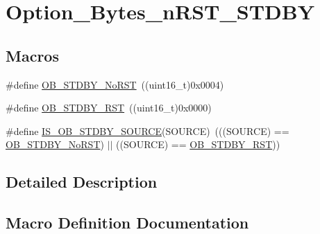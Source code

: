 \hypertarget{group___option___bytes__n_r_s_t___s_t_d_b_y}{}\section{Option\+\_\+\+Bytes\+\_\+n\+R\+S\+T\+\_\+\+S\+T\+D\+BY}
\label{group___option___bytes__n_r_s_t___s_t_d_b_y}
\subsection*{Macros}
\begin{DoxyCompactItemize}
\item 
\#define \mbox{\hyperlink{group___option___bytes__n_r_s_t___s_t_d_b_y_ga9588443b20719498422aeb72b65de839}{O\+B\+\_\+\+S\+T\+D\+B\+Y\+\_\+\+No\+R\+ST}}~((uint16\+\_\+t)0x0004)
\item 
\#define \mbox{\hyperlink{group___option___bytes__n_r_s_t___s_t_d_b_y_ga69451a6f69247528f58735c9c83499ce}{O\+B\+\_\+\+S\+T\+D\+B\+Y\+\_\+\+R\+ST}}~((uint16\+\_\+t)0x0000)
\item 
\#define \mbox{\hyperlink{group___option___bytes__n_r_s_t___s_t_d_b_y_ga8a05393df3a5e89551b4e2e1e8c5b884}{I\+S\+\_\+\+O\+B\+\_\+\+S\+T\+D\+B\+Y\+\_\+\+S\+O\+U\+R\+CE}}(S\+O\+U\+R\+CE)~(((S\+O\+U\+R\+CE) == \mbox{\hyperlink{group___option___bytes__n_r_s_t___s_t_d_b_y_ga9588443b20719498422aeb72b65de839}{O\+B\+\_\+\+S\+T\+D\+B\+Y\+\_\+\+No\+R\+ST}}) $\vert$$\vert$ ((S\+O\+U\+R\+CE) == \mbox{\hyperlink{group___option___bytes__n_r_s_t___s_t_d_b_y_ga69451a6f69247528f58735c9c83499ce}{O\+B\+\_\+\+S\+T\+D\+B\+Y\+\_\+\+R\+ST}}))
\end{DoxyCompactItemize}


\subsection{Detailed Description}


\subsection{Macro Definition Documentation}
\mbox{\label{group___option___bytes__n_r_s_t___s_t_d_b_y_ga8a05393df3a5e89551b4e2e1e8c5b884}} 

